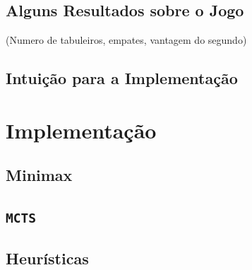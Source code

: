 \documentclass[12pt,a4paper,oneside]{article}
\begin{document}
\subsection{Alguns Resultados sobre o Jogo}

(Numero de tabuleiros, empates, vantagem do segundo)

\lipsum[1]

\lipsum[2]

\subsection{Intuição para a Implementação}

\lipsum[1]

\lipsum[2]


\section{Implementação}
\label{sec:imp}

\lipsum[1]

\subsection{Minimax}

\lipsum[1]

\lipsum[2]

\subsection{\texttt{MCTS}}

\lipsum[1]

\lipsum[2]

\lipsum[3]

\subsection{Heurísticas}

\lipsum[1]

\lipsum[2]

\lipsum[3]

\end{document}
